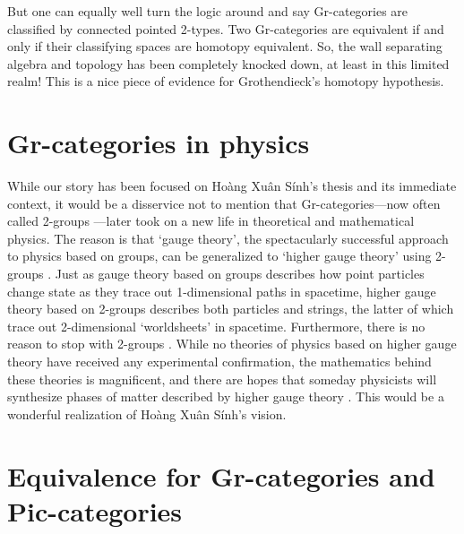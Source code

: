 \documentclass[reqno]{amsart}
\theoremstyle{definition}
\begin{document}
But one can equally well turn the logic around and say Gr-categories are classified by connected pointed 2-types.  Two Gr-categories are equivalent if and only if their classifying spaces are homotopy equivalent.   So, the wall separating algebra and topology has been completely knocked down, at least in this limited realm!  This is a nice piece of evidence for Grothendieck's homotopy hypothesis.

\section{Gr-categories in physics}
\label{sec:physics}

While our story has been focused on Ho\`ang Xu\^an S\'inh's thesis and its immediate context, it would be a disservice not to mention that Gr-categories---now often called 2-groups \cite{BL04}---later took on a new life in theoretical and mathematical physics.   The reason is that `gauge theory', the spectacularly successful approach to physics based on groups, can be generalized to `higher gauge theory' using 2-groups \cite{BH11,BS06}.  Just as gauge theory based on groups describes how point particles change state as they trace out 1-dimensional paths in spacetime, higher gauge theory based on 2-groups describes both particles and strings, the latter of which trace out 2-dimensional `worldsheets' in spacetime.  Furthermore, there is no reason to stop with 2-groups \cite{NSS23,S13}.    While no theories of physics based on higher gauge theory have received any experimental confirmation, the mathematics behind these theories is magnificent, and there are hopes that someday physicists will synthesize phases of matter described by higher gauge theory \cite{BCHK22,BHKR21}.  This would be a wonderful realization of Ho\`ang Xu\^an S\'inh's vision.

\appendix
\section{Equivalence for Gr-categories and Pic-categories}
\label{appendix}
\end{document}
